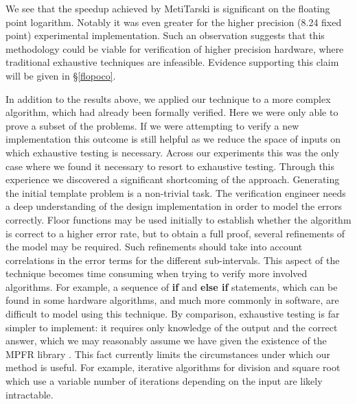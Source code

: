 \documentclass{fac}
\begin{document}
We see that the speedup achieved by MetiTarski is significant on the floating point logarithm. Notably it was even greater for the higher precision (8.24 fixed point) experimental implementation. Such an observation suggests that this methodology could be viable for verification of higher precision hardware, where traditional exhaustive techniques are infeasible. Evidence supporting this claim will be given in \S \ref{flopoco}.

In addition to the results above, we applied our technique to a more complex algorithm, which had already been formally verified. Here we were only able to prove a subset of the problems. If we were attempting to verify a new implementation this outcome is still helpful as we reduce the space of inputs on which exhaustive testing is necessary. Across our experiments this was the only case where we found it necessary to resort to exhaustive testing. Through this experience we discovered a significant shortcoming of the approach. Generating the initial template problem is a non-trivial task. The verification engineer needs a deep understanding of the design implementation in order to model the errors correctly. Floor functions may be used initially to establish whether the algorithm is correct to a higher error rate, but to obtain a full proof, several refinements of the model may be required. Such refinements should take into account correlations in the error terms for the different sub-intervals. This aspect of the technique becomes time consuming when trying to verify more involved algorithms. For example, a sequence of \textbf{if} and \textbf{else if} statements, which can be found in some hardware algorithms, and much more commonly in software, are difficult to model using this technique. By comparison, exhaustive testing is far simpler to implement: it requires only knowledge of the output and the correct answer, which we may reasonably assume we have given the existence of the MPFR library \cite{fousse2007mpfr}. This fact currently limits the circumstances under which our method is useful. For example, iterative algorithms for division and square root which use a variable number of iterations depending on the input are likely intractable. 


\end{document}
